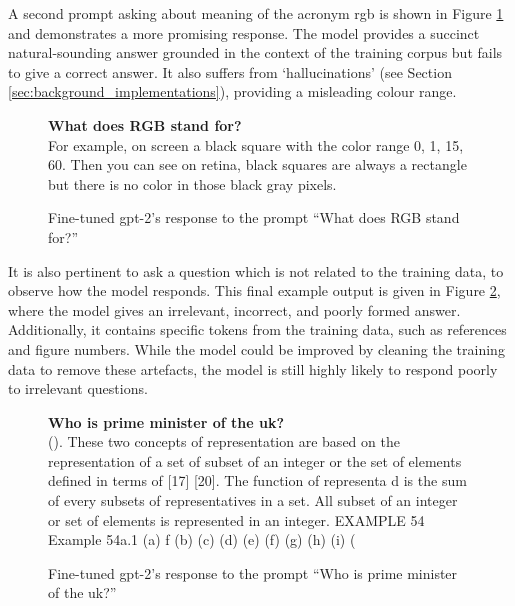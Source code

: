 A second prompt asking about meaning of the acronym \acrshort{rgb} is shown in Figure \ref{fig:results_mlm_ex2} and demonstrates a more promising response. The model provides a succinct natural-sounding answer grounded in the context of the training corpus but fails to give a correct answer. It also suffers from `hallucinations' (see Section \ref{sec:background_implementations}), providing a misleading colour range.

\begin{figure}[h]
    \begin{itquote}
        \textbf{What does RGB stand for?} \\
       For example, on screen a black square with the color range 0, 1, 15, 60.
        Then you can see on retina, black squares are always a rectangle but there is no color in those
        black gray pixels.
    \end{itquote}
    \caption{Fine-tuned \acrshort{gpt}-2's response to the prompt ``What does RGB stand for?''}
    \label{fig:results_mlm_ex2}
\end{figure}

It is also pertinent to ask a question which is not related to the training data, to observe how the model responds. This final example output is given in Figure \ref{fig:results_mlm_ex3}, where the model gives an irrelevant, incorrect, and poorly formed answer. Additionally, it contains specific tokens from the training data, such as references and figure numbers. While the model could be improved by cleaning the training data to remove these artefacts, the model is still highly likely to respond poorly to irrelevant questions.

\begin{figure}[h]
    \begin{itquote}
        \textbf{Who is prime minister of the uk?} \\ 
        (). These two concepts of  representation are based on the representation of a set of  subset of an integer or the set of elements defined in terms of [17] [20]. The function of representa d is  the sum of every subsets of  representatives in a set. All subset  of an integer or set of elements is represented in an integer. EXAMPLE 54 Example 54a.1  (a) f (b)  (c)  (d)  (e)  (f)  (g)   (h)  (i)  (
    \end{itquote}
    \caption{Fine-tuned \acrshort{gpt}-2's response to the prompt ``Who is prime minister of the uk?''}
    \label{fig:results_mlm_ex3}
\end{figure}

